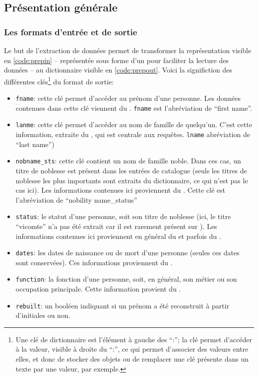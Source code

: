 \subsection{Présentation générale}
\subsubsection{Les formats d'entrée et de sortie}
Le but de l'extraction de données permet de transformer la représentation \tei{}  visible en \ref{code:prepin} -- représentée sous forme d'un \tsv{} pour faciliter la lecture des données -- au \gls{dictionnaire} visible en \ref{code:prepout}. Voici la significtion des différentes clés\footnote{Une clé de \gls{dictionnaire} est l'élément à gauche des \enquote{:}; la clé permet d'accéder à la valeur, visible à droite du \enquote{:}, ce qui permet d'associer des valeurs entre elles, et donc de stocker des objets ou de remplacer une clé présente dans un texte par une valeur, par exemple.} du format de sortie:
\begin{itemize}
	\item \texttt{fname}: cette clé permet d'accéder au prénom d'une personne. Les données contenues dans cette clé viennent du \tname{}. \texttt{fname} est l'abréviation de \enquote{first name}.
	\item \texttt{lanme}: cette clé permet d'accéder au nom de famille de quelqu'un. C'est cette information, extraite du \tname{}, qui est centrale aux requêtes. \texttt{lname} abréviation de \enquote{last name})
	\item \texttt{nobname\_sts}: cette clé contient un nom de famille noble. Dans ces cas, un titre de noblesse est présent dans les entrées de catalogue (seuls les titres de noblesse les plus importants sont extraits du dictionnaire, ce qui n'est pas le cas ici). Les informations contenues ici proviennent du \tname{}. Cette clé est l'abréviation de \enquote{nobility name\_status}
	\item \texttt{status}: le statut d'une personne, soit son titre de noblesse (ici, le titre \enquote{vicomte} n'a pas été extrait car il est rarement présent sur \wkd{}). Les informations contenues ici proviennent en général du \tname{} et parfois du \ttrait{}.
	\item \texttt{dates}: les dates de naissance ou de mort d'une personne (seules ces dates sont conservées). Ces informations proviennent du \ttrait{}.
	\item \texttt{function}: la fonction d'une personne, soit, en général, son métier ou son occupation principale. Cette information provient du \ttrait{}.
	\item \texttt{rebuilt}: un booléen indiquant si un prénom a été reconstruit à partir d'initiales ou non.
\end{itemize}

